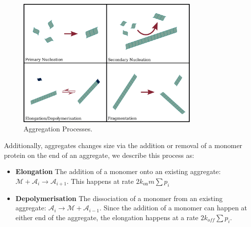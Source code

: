 \begin{figure}
    \centering
    \includegraphics[width=0.8\textwidth]{figures/aggProcesses.pdf}
    \caption{Aggregation Processes.}
    \label{fig:4-phase_sep_scheme}
\end{figure}

\noindent Additionally, aggregates changes size via the addition or removal of a monomer protein on the end of an aggregate, we describe this process as:
\begin{itemize}
    \item \textbf{Elongation} The addition of a monomer onto an existing aggregate: $\mathcal{M} + \mathcal{A}_{i} \rightarrow \mathcal{A}_{i+1}$. This happens at rate $2 k_\text{on} m \sum p_i$
    \item \textbf{Depolymerisation} The dissociation of a monomer from an existing aggregate: $\mathcal{A}_{i} \rightarrow \mathcal{M} + \mathcal{A}_{i-1}$. Since the addition of a monomer can happen at either end of the aggregate, the elongation happens at a rate $2 k_{off} \sum p_i$.
\end{itemize}

